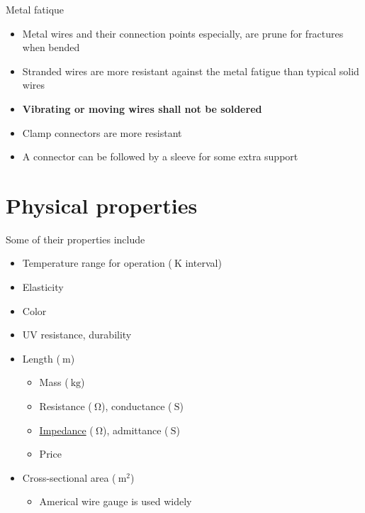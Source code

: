 \documentclass{beamer}
\begin{document}
\begin{frame}[label=fatique]{Metal fatique}
 \begin{itemize}
  \item Metal wires and their connection points especially, are prune for fractures when bended
  \item Stranded wires are more resistant against the metal fatigue than typical solid wires
  \item \textbf{Vibrating or moving wires shall not be soldered}
  \item Clamp connectors are more resistant
  \item A connector can be followed by a sleeve for some extra support
 \end{itemize}
\end{frame}

\section{Physical properties}

\begin{frame}{Some of their properties include}
 \begin{itemize}
  \item Temperature range for operation ($\SI{}{\kelvin}$ interval)
  \item Elasticity
  \item Color
  \item UV resistance, durability
  \item Length ($\SI{}{\meter}$)
   \begin{itemize}
    \item Mass ($\SI{}{\kilo\gram}$)
    \item Resistance ($\SI{}{\ohm}$), conductance ($\SI{}{\siemens}$)
    \item \hyperlink{impedance}{Impedance} ($\SI{}{\ohm}$), admittance ($\SI{}{\siemens}$)
    \item Price
   \end{itemize}
  \item Cross-sectional area ($\SI{}{\meter^2}$)~\cite{iec2004}
  \begin{itemize}
    \item Americal wire gauge is used widely
   \end{itemize}
 \end{itemize}
\end{frame}
\end{document}

